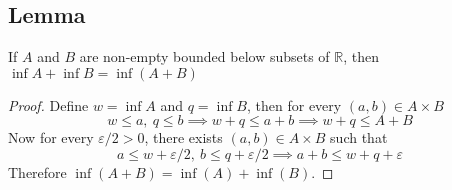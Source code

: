 \documentclass[../../main.tex]{subfiles}
\begin{document}
\subsection{Lemma}
\begin{lemma}\label{lemma:add_inf}
    If $A$ and $B$ are non-empty bounded below subsets of $\mathbb{R}$, then $\inf A +\inf B = \inf(A+B)$
\end{lemma}
\begin{proof}
        Define $w = \inf A$ and $q = \inf B$, then for every $(a,b)\in A\times B$
    \[
        w\leq a,\:q\leq b\implies w+q\leq a+b\implies w+q\leq A+B
    \]
    Now for every $\varepsilon/2>0$, there exists $(a,b)\in A\times B$ such that
    \[
    a\leq w+\varepsilon/2,\:b\leq q+\varepsilon/2\implies a+b\leq w + q + \varepsilon
    \]
    Therefore $\inf(A+B) = \inf(A) + \inf(B)$.
\end{proof}
\end{document}
